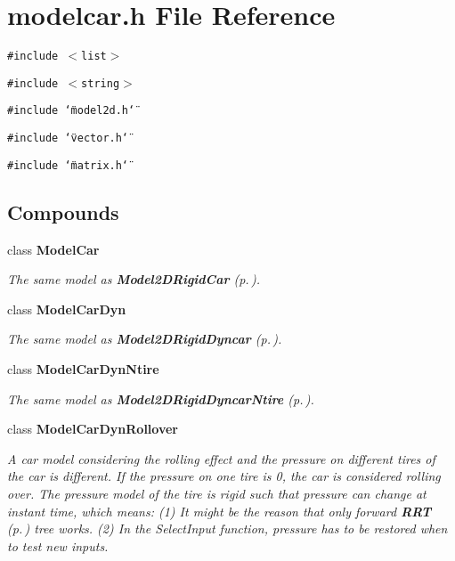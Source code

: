 \section{modelcar.h File Reference}
\label{modelcar_8h}
{\tt \#include $<$list$>$}\par
{\tt \#include $<$string$>$}\par
{\tt \#include \char`\"{}model2d.h\char`\"{}}\par
{\tt \#include \char`\"{}vector.h\char`\"{}}\par
{\tt \#include \char`\"{}matrix.h\char`\"{}}\par
\subsection*{Compounds}
\begin{CompactItemize}
\item 
class {\bf Model\-Car}
\begin{CompactList}\small\item\em The same model as {\bf Model2DRigid\-Car} {\rm (p.\,\pageref{classModel2DRigidCar})}.\item\end{CompactList}\item 
class {\bf Model\-Car\-Dyn}
\begin{CompactList}\small\item\em The same model as {\bf Model2DRigid\-Dyncar} {\rm (p.\,\pageref{classModel2DRigidDyncar})}.\item\end{CompactList}\item 
class {\bf Model\-Car\-Dyn\-Ntire}
\begin{CompactList}\small\item\em The same model as {\bf Model2DRigid\-Dyncar\-Ntire} {\rm (p.\,\pageref{classModel2DRigidDyncarNtire})}.\item\end{CompactList}\item 
class {\bf Model\-Car\-Dyn\-Rollover}
\begin{CompactList}\small\item\em A car model considering the rolling effect and the pressure on different tires of the car is different. If the pressure on one tire is 0, the car is considered rolling over. The pressure model of the tire is rigid such that pressure can change at instant time, which means: (1) It might be the reason that only forward {\bf RRT} {\rm (p.\,\pageref{classRRT})} tree works. (2) In the Select\-Input function, pressure has to be restored when to test new inputs.\item\end{CompactList}\item 

\end{CompactItemize}
